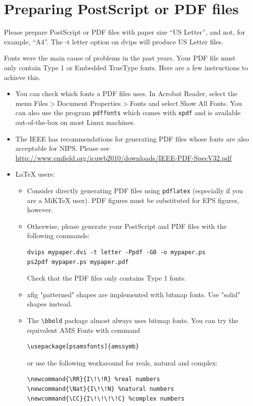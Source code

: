 \documentclass{article} %
\begin{document}
\section{Preparing PostScript or PDF files}

Please prepare PostScript or PDF files with paper size ``US Letter'', and
not, for example, ``A4''. The -t
letter option on dvips will produce US Letter files.

Fonts were the main cause of problems in the past years. Your PDF file must
only contain Type 1 or Embedded TrueType fonts. Here are a few instructions
to achieve this.

\begin{itemize}

\item You can check which fonts a PDF files uses.  In Acrobat Reader,
select the menu Files$>$Document Properties$>$Fonts and select Show All Fonts. You can
also use the program \verb+pdffonts+ which comes with \verb+xpdf+ and is
available out-of-the-box on most Linux machines.

\item The IEEE has recommendations for generating PDF files whose fonts
are also acceptable for NIPS. Please see
\url{http://www.emfield.org/icuwb2010/downloads/IEEE-PDF-SpecV32.pdf}

\item LaTeX users:

\begin{itemize}

\item Consider directly generating PDF files using \verb+pdflatex+
(especially if you are a MiKTeX user). 
PDF figures must be substituted for EPS figures, however.

\item Otherwise, please generate your PostScript and PDF files with the following commands:
\begin{verbatim} 
dvips mypaper.dvi -t letter -Ppdf -G0 -o mypaper.ps
ps2pdf mypaper.ps mypaper.pdf
\end{verbatim}

Check that the PDF files only contains Type 1 fonts. 

\item xfig "patterned" shapes are implemented with 
bitmap fonts.  Use "solid" shapes instead. 
\item The \verb+\bbold+ package almost always uses bitmap
fonts.  You can try the equivalent AMS Fonts with command
\begin{verbatim}
\usepackage[psamsfonts]{amssymb}
\end{verbatim}
 or use the following workaround for reals, natural and complex: 
\begin{verbatim}
\newcommand{\RR}{I\!\!R} %real numbers
\newcommand{\Nat}{I\!\!N} %natural numbers 
\newcommand{\CC}{I\!\!\!\!C} %complex numbers
\end{verbatim}


\end{itemize}
\end{itemize}
\end{document}

